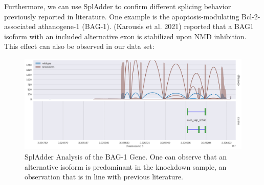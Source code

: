 \documentclass[
  letterpaper,
  DIV=11,
  numbers=noendperiod]{scrartcl}
\newenvironment{Shaded}{\begin{snugshade}}{\end{snugshade}}
\newcommand{\AttributeTok}[1]{\textcolor[rgb]{0.40,0.45,0.13}{#1}}
\newcommand{\BuiltInTok}[1]{\textcolor[rgb]{0.00,0.23,0.31}{#1}}
\newcommand{\DataTypeTok}[1]{\textcolor[rgb]{0.68,0.00,0.00}{#1}}
\newcommand{\ExtensionTok}[1]{\textcolor[rgb]{0.00,0.23,0.31}{#1}}
\newcommand{\NormalTok}[1]{\textcolor[rgb]{0.00,0.23,0.31}{#1}}
\newcommand{\StringTok}[1]{\textcolor[rgb]{0.13,0.47,0.30}{#1}}
\newcommand{\VariableTok}[1]{\textcolor[rgb]{0.07,0.07,0.07}{#1}}
\begin{document}
Furthermore, we can use SplAdder to confirm different splicing behavior
previously reported in literature. One example is the
apoptosis-modulating Bcl-2-associated athanogene-1 (BAG-1). (Karousis et
al. 2021) reported that a BAG1 isoform with an included alternative exon
is stabilized upon NMD inhibition. This effect can also be observed in
our data set:

\begin{Shaded}
\end{Shaded}

\begin{figure}

{\centering \includegraphics{splicing/plot.png}

}

\caption{SplAdder Analysis of the BAG-1 Gene. One can observe that an
alternative isoform is predominant in the knockdown sample, an
observation that is in line with previous literature.}

\end{figure}
\end{document}
